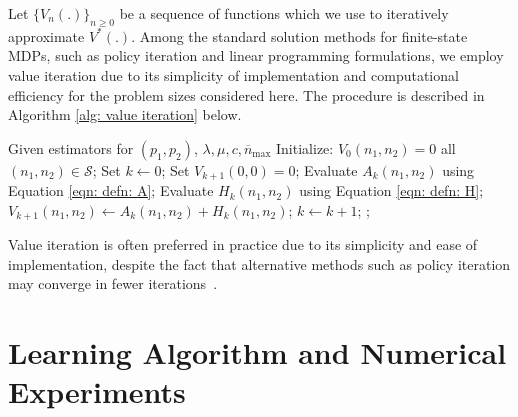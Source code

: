 \documentclass[11pt]{article}
\newcommand{\jp}[1]{\footnote{J-P: #1}}
\theoremstyle{remark}
\theoremstyle{definition}
\numberwithin{equation}{section}
\begin{document}
Let $\{V_n(.)\}_{n \geq 0}$ be a sequence of functions which we use to iteratively approximate $V^{*}(.)$. 
Among the standard solution methods for finite-state MDPs, such as policy iteration and linear programming formulations, we employ value iteration due to its simplicity of implementation and computational efficiency for the problem sizes considered here. 
The procedure is described in Algorithm \ref{alg: value iteration} below.
\begin{algorithm}[H]
    \caption{Value iteration to solve for optimal core allocation policy}
    \label{alg: value iteration}
    \begin{algorithmic}[1]
        \State Given estimators for $(p_1, p_2)$, $\lambda, \mu, c, \overline{n}_{\max}$
        \State Initialize: $V_0(n_1,n_2)=0$ all $(n_1,n_2) \in \mathcal S$;
        \State Set $k \gets 0$;
        \Repeat
        \State Set $V_{k+1}(0,0)=0$;
            \State Evaluate $A_k(n_1, n_2)$ using Equation \eqref{eqn: defn: A};
            \State Evaluate $H_k(n_1, n_2)$ using Equation \eqref{eqn: defn: H};
            \State $V_{k+1}(n_1,n_2) \gets A_k(n_1,n_2) + H_k(n_1,n_2)$;
        \EndFor
        \State $k \gets k+1$;
        ;
    \end{algorithmic}
\end{algorithm}

Value iteration is often preferred in practice due to its simplicity and ease of implementation, despite the fact that alternative methods such as policy iteration may converge in fewer iterations~\cite{puterman2014}.




\section{Learning Algorithm and Numerical Experiments} \label{section: numerical experiments}
\end{document}
